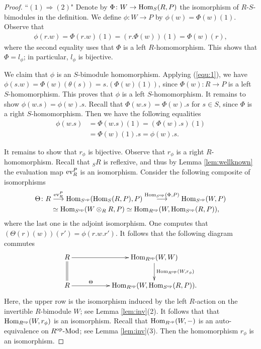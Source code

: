 \documentclass[a4paper]{amsart}
\theoremstyle{definition}
\theoremstyle{remark}
\numberwithin{equation}{section}
\begin{document}
\begin{proof}
``$(1)\Rightarrow (2)$" Denote by $\Phi\colon W\rightarrow {\rm Hom}_S(R, P)$ the isomorphism of $R$-$S$-bimodules
in the definition. We define $\phi\colon W\rightarrow P$ by $\phi(w)=\Phi(w)(1)$.
Observe that \begin{align}\label{equ:1}\phi(r.w)=\Phi(r.w)(1)=(r.\Phi(w))(1)=\Phi(w)(r),\end{align}
where the second equality uses that $\Phi$ is a left
$R$-homomorphism. This shows that $\Phi=l_\phi$; in particular, $l_\phi$ is bijective.

  We claim that $\phi$ is an $S$-bimodule homomorphism. Applying (\ref{equ:1}), we have $\phi(s.w)=\Phi(w)(\theta(s))=s.(\Phi(w)(1))$, since $\Phi(w)\colon R\rightarrow P$ is a left $S$-homomorphism. This proves that $\phi$ is a left $S$-homomorphism. It remains to show  $\phi(w.s)=\phi(w).s$. Recall that $\Phi(w.s)=\Phi(w).s$ for $s\in S$, since  $\Phi$ is a right $S$-homomorphism.  Then we have the following equalities \begin{align*}\phi(w.s)&=\Phi(w.s)(1)=(\Phi(w).s)(1)\\
                        &=\Phi(w)(1).s=\phi(w).s.\end{align*}

  It remains to show that $r_\phi$ is bijective. Observe that $r_\phi$ is a right $R$-homomorphism. Recall that $_SR$ is reflexive, and thus by Lemma \ref{lem:wellknown} the evaluation map ${\rm ev}_R^P$ is an isomorphism. Consider the following composite of isomorphisms
\begin{align*}
\Theta \colon R &\stackrel{{\rm ev}_R^P}\longrightarrow {\rm Hom}_{S^{\rm op}}({\rm Hom}_S(R, P), P)\stackrel{{\rm Hom}_{S^{\rm op}}(\Phi, P)}\longrightarrow {\rm Hom}_{S^{\rm op}}(W, P)\\
&\simeq {\rm Hom}_{S^{\rm op}}(W\otimes_R R, P) \simeq {\rm Hom}_{R^{\rm op}} (W, {\rm Hom}_{S^{\rm op}}(R, P)),
\end{align*}
where the last one is the adjoint isomorphism.  One computes that $(\Theta(r)(w))(r')=\phi(r.w.r')$.  It follows that
the following diagram commutes
\[\xymatrix{
R\ar[rr]\ar@{=}[d] && {\rm Hom}_{R^{\rm op}}(W, W)\ar[d]^-{{\rm Hom}_{R^{\rm op}}(W, r_\phi)}\\
R\ar[rr]^-{\Theta} &&  {\rm Hom}_{R^{\rm op}} (W, {\rm Hom}_{S^{\rm op}}(R, P)).
}\]
Here, the upper row is the isomorphism induced by the left $R$-action on the invertible $R$-bimodule $W$; see Lemma \ref{lem:inv}(2). It follows that that
${\rm Hom}_{R^{\rm op}}(W, r_\phi)$ is an isomorphism. Recall that ${\rm Hom}_{R^{\rm op}}(W, -)$ is an auto-equivalence
on $R^{\rm op}\mbox{-Mod}$; see Lemma \ref{lem:inv}(3). Then the homomorphism $r_\phi$ is an isomorphism.


\end{proof}
\end{document}
